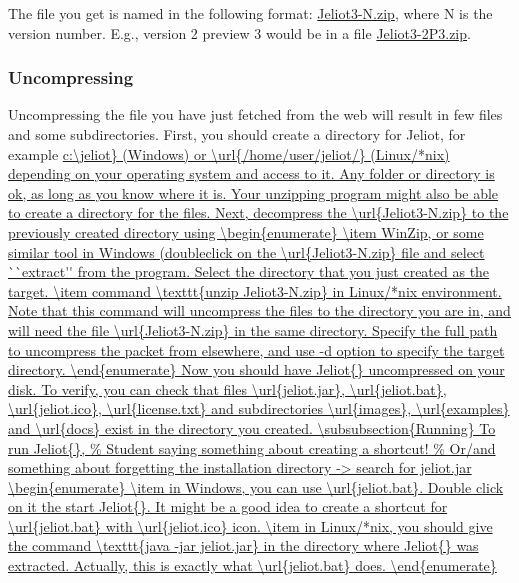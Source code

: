 \documentclass[a4paper,11pt,english]{article}
\newcommand{\jel}{Jeliot}
\newcommand{\file}{\url}
\newcommand{\p}[1]{\texttt{#1}}
\begin{document}
The file you get is named in the following format: \file{Jeliot3-N.zip}, where N is the version number. E.g., version 2 preview 3 would be in a file \file{Jeliot3-2P3.zip}.

\subsubsection{Uncompressing}

Uncompressing the file you have just fetched from the web will result in few files and some subdirectories. First, you should create a directory for Jeliot, for example \file{c:\jeliot\} (Windows) or \file{/home/user/jeliot/} (Linux/*nix) depending on your operating system and access to it. Any folder or directory is ok, as long as you know where it is. Your unzipping program might also be able to create a directory for the files.

Next, decompress the \file{Jeliot3-N.zip} to the previously created directory using

\begin{enumerate}
\item WinZip, or some similar tool in Windows (doubleclick on the \file{Jeliot3-N.zip} file and select ``extract'' from the program. Select the directory that you just created as the target.
\item command \p{unzip Jeliot3-N.zip} in Linux/*nix environment. Note that this command will uncompress the files to the directory you are in, and will need the file \file{Jeliot3-N.zip} in the same directory. Specify the full path to uncompress the packet from elsewhere, and use -d option to specify the target directory.
\end{enumerate}

Now you should have \jel{} uncompressed on your disk. To verify, you can check that files \file{jeliot.jar}, \file{jeliot.bat}, \file{jeliot.ico}, \file{license.txt} and subdirectories \file{images}, \file{examples} and \file{docs} exist in the directory you created.

\subsubsection{Running}

To run \jel{}, 


\begin{enumerate}
\item in Windows, you can use \file{jeliot.bat}. Double click on it the start \jel{}. It might be a good idea to create a shortcut for \file{jeliot.bat} with \file{jeliot.ico} icon.
\item in Linux/*nix, you should give the command \p{java -jar jeliot.jar} in the directory where \jel{} was extracted. Actually, this is exactly what \file{jeliot.bat} does.
\end{enumerate}

}
\end{document}

